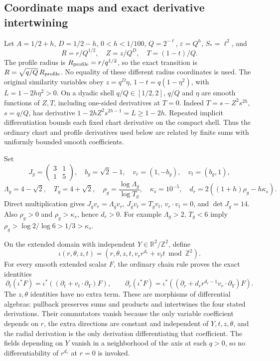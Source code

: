 \documentclass[10pt,a4paper]{article}
\begin{document}
\subsection{Coordinate maps and exact derivative intertwining}\label{coordinate-maps-and-exact-derivative-intertwining}

Let \(A=1/2+h\), \(D=1/2-h\), \(0<h<1/100\), \(Q=2^{-\ell}\), \(\varepsilon=Q^h\), \(S_*=\ell^2\), and \[
R=r/Q^{1/2},\quad Z=z/Q^D,\quad T=(1-t)/Q.
\] The profile radius is \(R_{\rm profile}=r/q^{1/2}\), so the exact transition is \(R=\sqrt{q/Q}\,R_{\rm profile}\). No equality of these different radius coordinates is used. The original similarity variables obey \(z=q^D\eta\), \(1-t=q(1-\eta^2)\), with \(L=1-2h\eta^2>0\). On a dyadic shell \(q/Q\in[1/2,2]\), \(q/Q\) and \(\eta\) are smooth functions of \(Z,T\), including one-sided derivatives at \(T=0\). Indeed \(T=s-Z^2s^{2h}\), \(s=q/Q\), has derivative \(1-2hZ^2s^{2h-1}=L\ge1-2h\). Repeated implicit differentiation bounds each fixed chart derivative on the compact shell. Thus the ordinary chart and profile derivatives used below are related by finite sums with uniformly bounded smooth coefficients.

Set \[
J_g=\begin{pmatrix}3&1\\1&5\end{pmatrix},\quad b_g=\sqrt2-1,
\quad v_r=(1,-b_g),\quad v_t=(b_g,1),
\] \[
\Lambda_g=4-\sqrt2,\quad T_g=4+\sqrt2,\quad
\rho_g=\frac{\log\Lambda_g}{\log T_g},\quad \kappa_s=10^{-5},
\quad d_r=2((1+h)\rho_g-h\kappa_s).
\] Direct multiplication gives \(J_gv_r=\Lambda_gv_r\), \(J_gv_t=T_gv_t\), \(v_r\cdot v_t=0\), and \(\det J_g=14\). Also \(\rho_g>0\) and \(\rho_g>\kappa_s\), hence \(d_r>0\). For example \(\Lambda_g>2\), \(T_g<6\) imply \(\rho_g>\log2/\log6>1/3>\kappa_s\).

On the extended domain with independent \(Y\in\mathbb R^2/\mathbb Z^2\), define \[
\iota(r,\theta,z,t)=(r,\theta,z,t,v_rr^{d_r}+v_tt\bmod\mathbb Z^2).
\] For every smooth extended scalar \(F\), the ordinary chain rule proves the exact identities \[
\partial_t(\iota^*F)=\iota^*((\partial_t+v_t\cdot\partial_Y)F),\qquad
\partial_r(\iota^*F)=\iota^*((\partial_r+d_rr^{d_r-1}v_r\cdot\partial_Y)F).
\] The \(z,\theta\) identities have no extra term. These are morphisms of differential algebras: pullback preserves sums and products and intertwines the four stated derivations. Their commutators vanish because the only variable coefficient depends on \(r\), the extra directions are constant and independent of \(Y,t,z,\theta\), and the radial derivation is the only derivation differentiating that coefficient. The fields depending on \(Y\) vanish in a neighborhood of the axis at each \(q>0\), so no differentiability of \(r^{d_r}\) at \(r=0\) is invoked.
\end{document}
